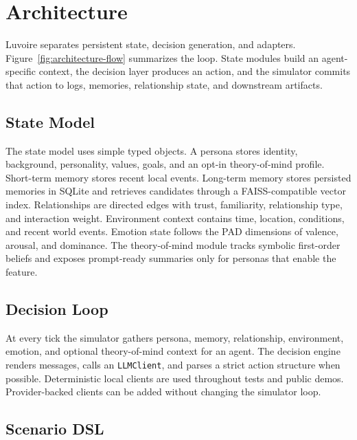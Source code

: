 \section{Architecture}

Luvoire separates persistent state, decision generation, and adapters. Figure~\ref{fig:architecture-flow} summarizes the loop. State modules build an agent-specific context, the decision layer produces an action, and the simulator commits that action to logs, memories, relationship state, and downstream artifacts.



\subsection{State Model}

The state model uses simple typed objects. A persona stores identity, background, personality, values, goals, and an opt-in theory-of-mind profile. Short-term memory stores recent local events. Long-term memory stores persisted memories in SQLite and retrieves candidates through a FAISS-compatible vector index. Relationships are directed edges with trust, familiarity, relationship type, and interaction weight. Environment context contains time, location, conditions, and recent world events. Emotion state follows the PAD dimensions of valence, arousal, and dominance. The theory-of-mind module tracks symbolic first-order beliefs and exposes prompt-ready summaries only for personas that enable the feature.




\subsection{Decision Loop}

At every tick the simulator gathers persona, memory, relationship, environment, emotion, and optional theory-of-mind context for an agent. The decision engine renders messages, calls an \texttt{LLMClient}, and parses a strict action structure when possible. Deterministic local clients are used throughout tests and public demos. Provider-backed clients can be added without changing the simulator loop.



\subsection{Scenario DSL}

